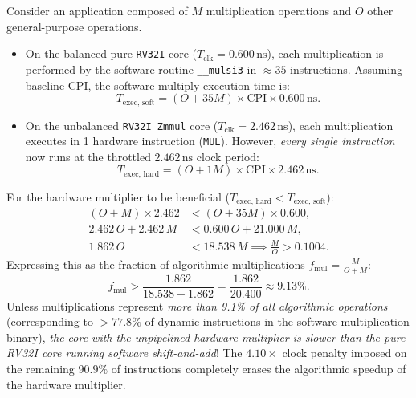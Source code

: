 \begin{enumerate}
    Consider an application composed of $M$ multiplication operations and $O$ other general-purpose operations.
    \begin{itemize}
        \item On the balanced pure \texttt{RV32I} core ($T_{\text{clk}} = 0.600\,\text{ns}$), each multiplication is performed by the software routine \texttt{\_\_mulsi3} in $\approx 35$ instructions. Assuming baseline CPI, the software-multiply execution time is:
        \begin{equation}
        T_{\text{exec, soft}} = (O + 35M) \times \text{CPI} \times 0.600\,\text{ns}.
        \end{equation}
        \item On the unbalanced \texttt{RV32I\_Zmmul} core ($T_{\text{clk}} = 2.462\,\text{ns}$), each multiplication executes in 1 hardware instruction (\texttt{MUL}). However, \textit{every single instruction} now runs at the throttled $2.462\,\text{ns}$ clock period:
        \begin{equation}
        T_{\text{exec, hard}} = (O + 1M) \times \text{CPI} \times 2.462\,\text{ns}.
        \end{equation}
    \end{itemize}
    For the hardware multiplier to be beneficial ($T_{\text{exec, hard}} < T_{\text{exec, soft}}$):
    \begin{align}
    (O + M) \times 2.462 &< (O + 35M) \times 0.600, \\
    2.462\,O + 2.462\,M &< 0.600\,O + 21.000\,M, \\
    1.862\,O &< 18.538\,M \implies \frac{M}{O} > 0.1004.
    \end{align}
    Expressing this as the fraction of algorithmic multiplications $f_{\text{mul}} = \frac{M}{O + M}$:
    \begin{equation}
    f_{\text{mul}} > \frac{1.862}{18.538 + 1.862} = \frac{1.862}{20.400} \approx \mathbf{9.13\%}.
    \end{equation}
    Unless multiplications represent \textit{more than 9.1\% of all algorithmic operations} (corresponding to $>77.8\%$ of dynamic instructions in the software-multiplication binary), \textit{the core with the unpipelined hardware multiplier is slower than the pure RV32I core running software shift-and-add}! The $4.10\times$ clock penalty imposed on the remaining $90.9\%$ of instructions completely erases the algorithmic speedup of the hardware multiplier.
\end{enumerate}

